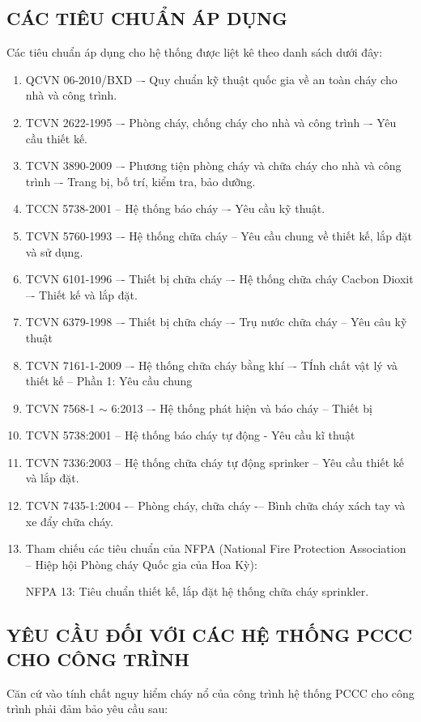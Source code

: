 \subsection{CÁC TIÊU CHUẨN ÁP DỤNG}
Các tiêu chuẩn áp dụng cho hệ thống được liệt kê theo danh sách dưới đây:
\begin{enumerate}
	\item QCVN 06-2010/BXD –- Quy chuẩn kỹ thuật quốc gia về an toàn cháy cho nhà và công trình.
	\item TCVN 2622-1995 –- Phòng cháy, chống cháy cho nhà và công trình –- Yêu cầu thiết kế.
	\item TCVN 3890-2009 –- Phương tiện phòng cháy và chữa cháy cho nhà và công trình –- Trang bị, bố trí, kiểm tra, bảo dưỡng.
	\item TCCN 5738-2001 -- Hệ thống báo cháy –- Yêu cầu kỹ thuật.
	\item TCVN 5760-1993 –- Hệ thống chữa cháy – Yêu cầu chung về thiết kế, lắp đặt và sử dụng.
	\item TCVN 6101-1996 –- Thiết bị chữa cháy –- Hệ thống chữa cháy Cacbon Dioxit –- Thiết kế và lắp đặt.
	\item TCVN 6379-1998 –- Thiết bị chữa cháy –- Trụ nước chữa cháy – Yêu câu kỹ thuật
	\item TCVN 7161-1-2009 –- Hệ thống chữa cháy bằng khí –- TÍnh chất vật lý và thiết kế -- Phần 1: Yêu cầu chung
	\item TCVN 7568-1 $\sim$ 6:2013 –- Hệ thống phát hiện và báo cháy – Thiết bị
	\item TCVN 5738:2001 -- Hệ thống báo cháy tự động - Yêu cầu kĩ thuật
	\item TCVN 7336:2003 -- Hệ thống chữa cháy tự động sprinker – Yêu cầu thiết kế và lắp đặt.
	\item TCVN 7435-1:2004 -– Phòng cháy, chữa cháy -– Bình chữa cháy xách tay và xe đẩy chữa cháy.
	\item Tham chiếu các tiêu chuẩn của NFPA (National Fire Protection Association -- Hiệp hội Phòng cháy Quốc gia của Hoa Kỳ):
	
	NFPA 13: Tiêu chuẩn thiết kế, lắp đặt hệ thống chữa cháy sprinkler.
\end{enumerate}

\subsection{YÊU CẦU ĐỐI VỚI CÁC HỆ THỐNG PCCC CHO CÔNG TRÌNH}
Căn cứ vào tính chất nguy hiểm cháy nổ của công trình hệ thống PCCC cho công trình phải đảm bảo yêu cầu sau:
